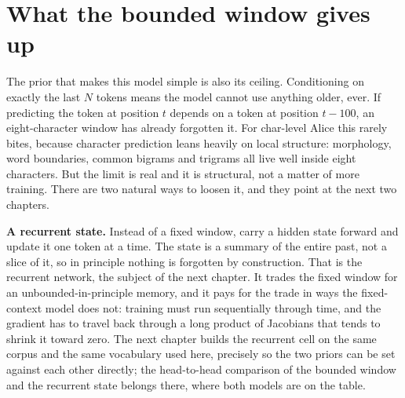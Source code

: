 
\section{What the bounded window gives up}\label{sec:window-limits}

The prior that makes this model simple is also its ceiling. Conditioning
on exactly the last $N$ tokens means the model cannot use anything older,
ever. If predicting the token at position $t$ depends on a token at
position $t - 100$, an eight-character window has already forgotten it. For
char-level Alice this rarely bites, because character prediction leans
heavily on local structure: morphology, word boundaries, common bigrams
and trigrams all live well inside eight characters. But the limit is real
and it is structural, not a matter of more training. There are two natural
ways to loosen it, and they point at the next two chapters.

\textbf{A recurrent state.} Instead of a fixed window, carry a hidden
state forward and update it one token at a time. The state is a summary of
the entire past, not a slice of it, so in principle nothing is forgotten by
construction. That is the recurrent network, the subject of the next
chapter. It trades the fixed window for an unbounded-in-principle memory,
and it pays for the trade in ways the fixed-context model does not:
training must run sequentially through time, and the gradient has to travel
back through a long product of Jacobians that tends to shrink it toward
zero. The next chapter builds the recurrent cell on the same corpus and the
same vocabulary used here, precisely so the two priors can be set against
each other directly; the head-to-head comparison of the bounded window and
the recurrent state belongs there, where both models are on the table.


